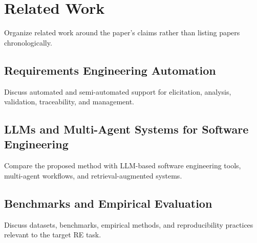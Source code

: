 \section{Related Work}

Organize related work around the paper's claims rather than listing papers chronologically.

\subsection{Requirements Engineering Automation}

Discuss automated and semi-automated support for elicitation, analysis, validation, traceability, and management.

\subsection{LLMs and Multi-Agent Systems for Software Engineering}

Compare the proposed method with LLM-based software engineering tools, multi-agent workflows, and retrieval-augmented systems.

\subsection{Benchmarks and Empirical Evaluation}

Discuss datasets, benchmarks, empirical methods, and reproducibility practices relevant to the target RE task.

